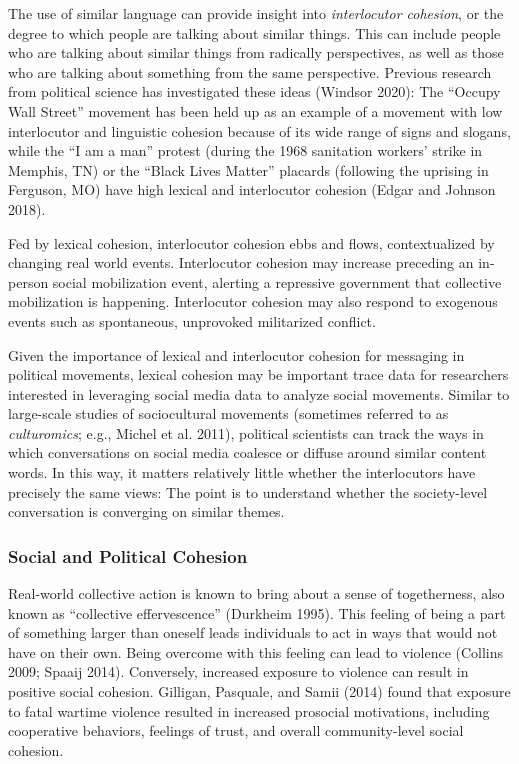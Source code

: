 \documentclass[
  english,
  man]{apa6}
\begin{document}
The use of similar language can provide insight into \emph{interlocutor cohesion}, or
the degree to which people are talking about similar things. This can include
people who are talking about similar things from radically perspectives, as well
as those who are talking about something from the same perspective. Previous
research from political science has investigated these ideas (Windsor 2020): The
\enquote{Occupy Wall Street} movement has been held up as an example of a movement with
low interlocutor and linguistic cohesion because of its wide range of signs and
slogans, while the \enquote{I am a man} protest (during the 1968 sanitation workers'
strike in Memphis, TN) or the \enquote{Black Lives Matter} placards (following the
uprising in Ferguson, MO) have high lexical and interlocutor cohesion
(Edgar and Johnson 2018).

Fed by lexical cohesion, interlocutor cohesion ebbs and flows, contextualized by
changing real world events. Interlocutor cohesion may increase preceding an
in-person social mobilization event, alerting a repressive government that
collective mobilization is happening. Interlocutor cohesion may also respond to
exogenous events such as spontaneous, unprovoked militarized conflict.

Given the importance of lexical and interlocutor cohesion for messaging in
political movements, lexical cohesion may be important trace data for
researchers interested in leveraging social media data to analyze social
movements. Similar to large-scale studies of sociocultural movements (sometimes
referred to as \emph{culturomics}; e.g., Michel et al. 2011), political
scientists can track the ways in which conversations on social media coalesce or
diffuse around similar content words. In this way, it matters relatively little
whether the interlocutors have precisely the same views: The point is to
understand whether the society-level conversation is converging on similar
themes.

\hypertarget{social-and-political-cohesion}{%
\subsubsection{Social and Political Cohesion}\label{social-and-political-cohesion}}

Real-world collective action is known to bring about a sense of togetherness,
also known as \enquote{collective effervescence} (Durkheim 1995). This feeling
of being a part of something larger than oneself leads individuals to act in
ways that would not have on their own. Being overcome with this feeling can lead
to violence (Collins 2009; Spaaij 2014). Conversely, increased
exposure to violence can result in positive social cohesion. Gilligan, Pasquale, and Samii (2014)
found that exposure to fatal wartime violence resulted in increased prosocial
motivations, including cooperative behaviors, feelings of trust, and overall
community-level social cohesion.
\end{document}
